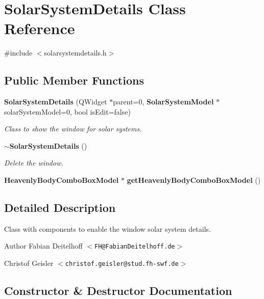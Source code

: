 \section{\-Solar\-System\-Details \-Class \-Reference}
\label{d7/d6d/classSolarSystemDetails}


{\ttfamily \#include $<$solarsystemdetails.\-h$>$}

\subsection*{\-Public \-Member \-Functions}
\begin{DoxyCompactItemize}
\item 
{\bf \-Solar\-System\-Details} (\-Q\-Widget $\ast$parent=0, {\bf \-Solar\-System\-Model} $\ast$solar\-System\-Model=0, bool is\-Edit=false)
\begin{DoxyCompactList}\small\item\em \-Class to show the window for solar systems. \end{DoxyCompactList}\item 
{\bf $\sim$\-Solar\-System\-Details} ()\label{d7/d6d/classSolarSystemDetails_ac49dcc9ed2db5e6591a4d0e3296aa31f}

\begin{DoxyCompactList}\small\item\em \-Delete the window. \end{DoxyCompactList}\item 
{\bf \-Heavenly\-Body\-Combo\-Box\-Model} $\ast$ {\bfseries get\-Heavenly\-Body\-Combo\-Box\-Model} ()\label{d7/d6d/classSolarSystemDetails_af8aceddb464317fcd236792f9a6b19a6}

\end{DoxyCompactItemize}


\subsection{\-Detailed \-Description}
\-Class with components to enable the window solar system details.

\begin{DoxyAuthor}{\-Author}
\-Fabian \-Deitelhoff $<${\tt \-F\-H@\-Fabian\-Deitelhoff.\-de}$>$ 

\-Christof \-Geisler $<${\tt christof.\-geisler@stud.\-fh-\/swf.\-de}$>$ 
\end{DoxyAuthor}


\subsection{\-Constructor \& \-Destructor \-Documentation}
